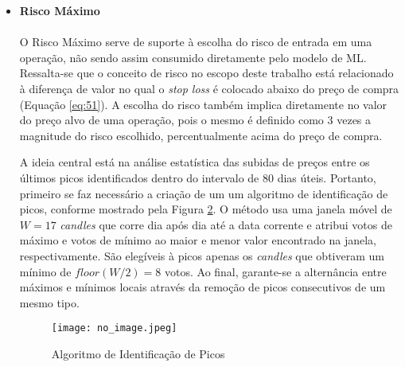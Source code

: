 \begin{itemize}
    A Figura \ref{fig:105} mostra o resultado do algoritmo para dois papéis de comportamentos distintos: MGLU3 representando um companhia com foco em alto crescimento, portanto mais instável; e ABEV3 representando uma companhia já bem consolidada no mercado, com menos oportunidades de crescimento. \color{red} HERALDO: Precisa de alguma citação aqui para suportar as afirmações feitas?  \\

    \begin{figure}[h]
        \texttt{[image: no\_image.jpeg]}
        \centering
        \caption{Risco Mínimo para ABEV3 e MGLU3}
        \label{fig:105}
    \end{figure}

    \item \textbf{Risco Máximo} \\ \\
    O Risco Máximo serve de suporte à escolha do risco de entrada em uma operação, não sendo assim consumido diretamente pelo modelo de ML. Ressalta-se que o conceito de risco no escopo deste trabalho está relacionado à diferença de valor no qual o \textit{stop loss} é colocado abaixo do preço de compra (Equação \ref{eq:51}). A escolha do risco também implica diretamente no valor do preço alvo de uma operação, pois o mesmo é definido como 3 vezes a magnitude do risco escolhido, percentualmente acima do preço de compra.

    A ideia central está na análise estatística das subidas de preços entre os últimos picos identificados dentro do intervalo de 80 dias úteis. Portanto, primeiro se faz necessário a criação de um um algoritmo de identificação de picos, conforme mostrado pela Figura \ref{fig:106}. O método usa uma janela móvel de \begin{math} W = 17 \end{math} \textit{candles} que corre dia após dia até a data corrente e atribui votos de máximo e votos de mínimo ao maior e menor valor encontrado na janela, respectivamente. São elegíveis à picos apenas os \textit{candles} que obtiveram um mínimo de \begin{math}  floor(W / 2) = 8 \end{math} votos. Ao final, garante-se a alternância entre máximos e mínimos locais através da remoção de picos consecutivos de um mesmo tipo.

    \begin{figure}[h]
        \texttt{[image: no\_image.jpeg]}
        \centering
        \caption{Algoritmo de Identificação de Picos}
        \label{fig:106}
    \end{figure}


\end{itemize}
